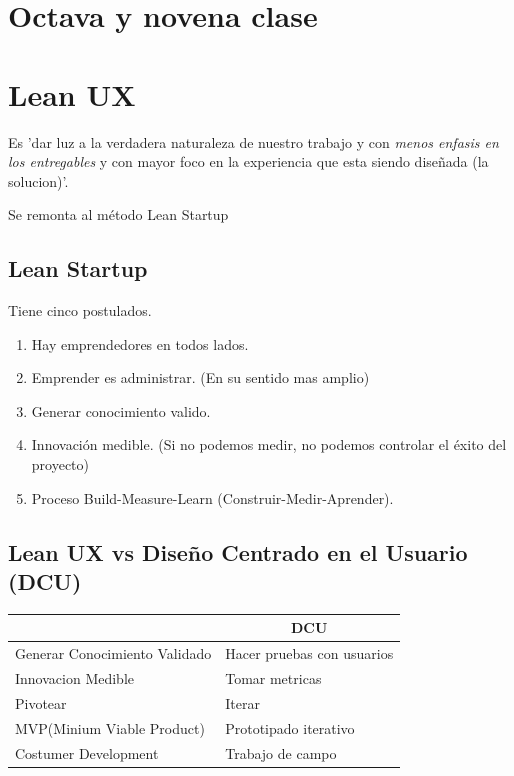\documentclass[titlepage,a4paper]{article}
\begin{document}
\section*{Octava y novena clase}
\section{Lean UX}
Es 'dar luz a la verdadera naturaleza de nuestro trabajo y con \emph{menos enfasis en los entregables} y con mayor foco en la experiencia que esta siendo diseñada (la solucion)'.

Se remonta al método Lean Startup
\subsection{Lean Startup}
Tiene cinco postulados.
\begin{enumerate}
    \item Hay emprendedores en todos lados.
    \item Emprender es administrar. (En su sentido mas amplio)
    \item Generar conocimiento valido.
    \item Innovación medible. (Si no podemos medir, no podemos controlar el éxito del proyecto)
    \item Proceso Build-Measure-Learn (Construir-Medir-Aprender).
\end{enumerate}

\subsection{Lean UX vs Diseño Centrado en el Usuario (DCU)}

\begin{center}
\begin{table}[!htb]
\centering
\begin{tabular}{|l|l|}
\hline
\rowcolor[HTML]{FFFE65} 
\multicolumn{1}{|c|}{\cellcolor[HTML]{FFFE65}Lean UX} & \multicolumn{1}{c|}{\cellcolor[HTML]{FFFE65}DCU} \\ \hline
Generar Conocimiento Validado                         & Hacer pruebas con usuarios                       \\ \hline
Innovacion Medible                                    & Tomar metricas                                   \\ \hline
Pivotear                                              & Iterar                                           \\ \hline
MVP(Minium Viable Product)                            & Prototipado iterativo                            \\ \hline
Costumer Development                                  & Trabajo de campo                                 \\ \hline
\end{tabular}
\end{table}
\end{center}
\end{document}

